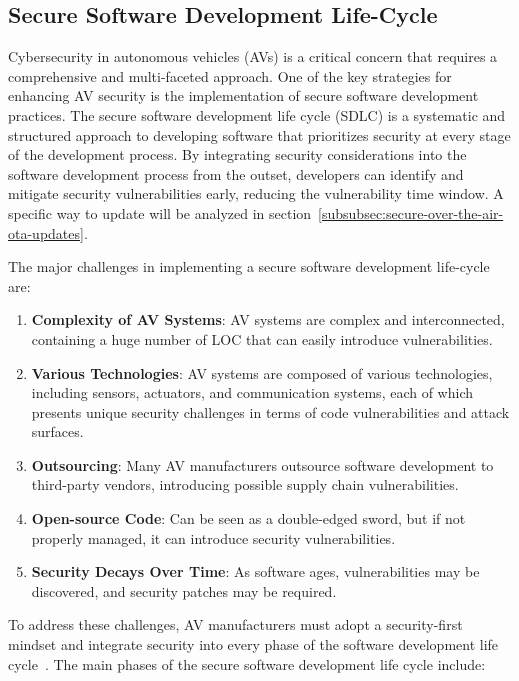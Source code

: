 \subsection{Secure Software Development Life-Cycle}\label{subsec:secure-software-development-life-cycle}

Cybersecurity in autonomous vehicles (AVs) is a critical concern that requires a comprehensive and multi-faceted approach.
One of the key strategies for enhancing AV security is the implementation of secure software development practices.
The secure software development life cycle (SDLC) is a systematic and structured approach to developing software that prioritizes security at every stage of the development process.
By integrating security considerations into the software development process from the outset, developers can identify and mitigate security vulnerabilities early, reducing the vulnerability time window.
A specific way to update will be analyzed in section~\ref{subsubsec:secure-over-the-air-ota-updates}.

The major challenges in implementing a secure software development life-cycle are:
\begin{enumerate}
    \item \textbf{Complexity of AV Systems}: AV systems are complex and interconnected, containing a huge number of LOC that can easily introduce vulnerabilities.
    \item \textbf{Various Technologies}: AV systems are composed of various technologies, including sensors, actuators, and communication systems, each of which presents unique security challenges in terms of code vulnerabilities and attack surfaces.
    \item \textbf{Outsourcing}: Many AV manufacturers outsource software development to third-party vendors, introducing possible supply chain vulnerabilities.
    \item \textbf{Open-source Code}: Can be seen as a double-edged sword, but if not properly managed, it can introduce security vulnerabilities.
    \item \textbf{Security Decays Over Time}: As software ages, vulnerabilities may be discovered, and security patches may be required.
\end{enumerate}

To address these challenges, AV manufacturers must adopt a security-first mindset and integrate security into every phase of the software development life cycle~\cite{moukahal2021towards}.
The main phases of the secure software development life cycle include:

